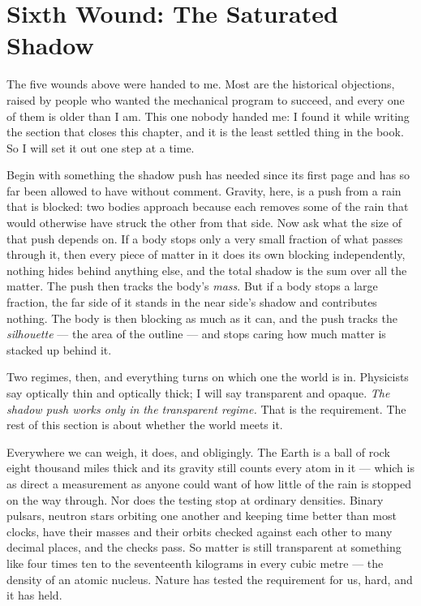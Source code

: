 \section{Sixth Wound: The Saturated Shadow}

The five wounds above were handed to me. Most are the historical objections, raised by people who wanted the mechanical program to succeed, and every one of them is older than I am. This one nobody handed me: I found it while writing the section that closes this chapter, and it is the least settled thing in the book. So I will set it out one step at a time.

Begin with something the shadow push has needed since its first page and has so far been allowed to have without comment. Gravity, here, is a push from a rain that is blocked: two bodies approach because each removes some of the rain that would otherwise have struck the other from that side. Now ask what the size of that push depends on. If a body stops only a very small fraction of what passes through it, then every piece of matter in it does its own blocking independently, nothing hides behind anything else, and the total shadow is the sum over all the matter. The push then tracks the body's \emph{mass}. But if a body stops a large fraction, the far side of it stands in the near side's shadow and contributes nothing. The body is then blocking as much as it can, and the push tracks the \emph{silhouette} --- the area of the outline --- and stops caring how much matter is stacked up behind it.

Two regimes, then, and everything turns on which one the world is in. Physicists say optically thin and optically thick; I will say transparent and opaque. \emph{The shadow push works only in the transparent regime.} That is the requirement. The rest of this section is about whether the world meets it.

Everywhere we can weigh, it does, and obligingly. The Earth is a ball of rock eight thousand miles thick and its gravity still counts every atom in it --- which is as direct a measurement as anyone could want of how little of the rain is stopped on the way through. Nor does the testing stop at ordinary densities. Binary pulsars, neutron stars orbiting one another and keeping time better than most clocks, have their masses and their orbits checked against each other to many decimal places, and the checks pass. So matter is still transparent at something like four times ten to the seventeenth kilograms in every cubic metre --- the density of an atomic nucleus. Nature has tested the requirement for us, hard, and it has held.

